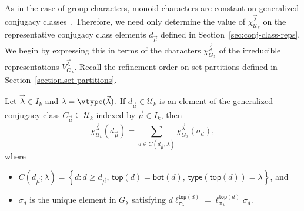 As in the case of group characters, monoid characters are constant on
generalized conjugacy classes~\cite[Proposition~7.9]{Steinberg.2016}.
Therefore, we need only determine the value of
$\chi^{\vec{\lambda}}_{\mathcal{U}_k}$
on the representative conjugacy class elements
$d_{\vec{\mu}}$ defined in Section~\ref{sec:conj-class-reps}.
We begin by expressing this in terms of the characters
$\chi^{\vec{\lambda}}_{G_\lambda}$
of the irreducible representations $V^{\vec{\lambda}}_{G_\lambda}$.
Recall the refinement order on set partitions defined in Section~\ref{section.set partitions}.

\begin{prop}
\label{prop:char}
Let $\vec{\lambda} \in I_k$ and $\lambda = \vtype(\vec{\lambda})$.
If $d_{\vec{\mu}} \in \mathcal{U}_k$ is an element of the generalized conjugacy
class $C_{\vec{\mu}} \subseteq \mathcal{U}_k$ indexed by $\vec{\mu} \in I_k$, then
\[
    \chi^{\vec{\lambda}}_{\mathcal{U}_k}(d_{\vec{\mu}})
    = \sum_{d \in C(d_{\vec{\mu}}; \lambda)} \chi^{\vec{\lambda}}_{G_\lambda}(\sigma_d),
\]
where
\begin{itemize}
    \item
        $C(d_{\vec{\mu}}; \lambda)
        = \left\{
        d : d \geqslant d_{\vec{\mu}}, \,
        \mathsf{top}(d) = \mathsf{bot}(d), \, \mathsf{type}(\mathsf{top}(d))=\lambda
        \right\}$, and
    \item
        $\sigma_d$ is the unique element in $G_\lambda$ satisfying
        $d \ell_{\pi_\lambda}^{\mathsf{top}(d)} = \ell_{\pi_\lambda}^{\mathsf{top}(d)} \sigma_d$.
\end{itemize}
\end{prop}

